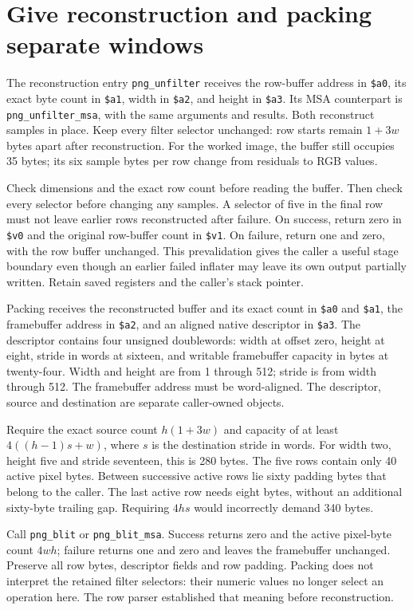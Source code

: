 \section{Give reconstruction and packing separate windows}
The reconstruction entry \texttt{png\_unfilter} receives the row-buffer address in
\texttt{\$a0}, its exact byte count in \texttt{\$a1}, width in \texttt{\$a2}, and
height in \texttt{\$a3}. Its MSA counterpart is \texttt{png\_unfilter\_msa}, with the
same arguments and results. Both reconstruct samples in place. Keep every filter
selector unchanged: row starts remain $1+3w$ bytes apart after reconstruction.
For the worked image, the buffer still occupies 35 bytes; its six sample bytes per
row change from residuals to RGB values.

Check dimensions and the exact row count before reading the buffer. Then check every
selector before changing any samples. A selector of five in the final row must not
leave earlier rows reconstructed after failure. On success, return zero in
\texttt{\$v0} and the original row-buffer count in \texttt{\$v1}. On failure,
return one and zero, with the row buffer unchanged. This prevalidation gives the
caller a useful stage boundary even though an earlier failed inflater may leave its
own output partially written. Retain saved registers and the caller's stack pointer.

Packing receives the reconstructed buffer and its exact count in \texttt{\$a0}
and \texttt{\$a1}, the framebuffer address in \texttt{\$a2}, and an aligned native
descriptor in \texttt{\$a3}. The descriptor contains four unsigned doublewords:
width at offset zero, height at eight, stride in words at sixteen, and writable
framebuffer capacity in bytes at twenty-four. Width and height are from 1 through
512; stride is from width through 512. The framebuffer address must be word-aligned.
The descriptor, source and destination are separate caller-owned objects.

Require the exact source count $h(1+3w)$ and capacity of at least
$4((h-1)s+w)$, where $s$ is the destination stride in words. For width two,
height five and stride seventeen, this is 280 bytes. The five rows contain only
40 active pixel bytes. Between successive active rows lie sixty padding bytes that
belong to the caller. The last active row needs eight bytes, without an additional
sixty-byte trailing gap. Requiring $4hs$ would incorrectly demand 340 bytes.

Call \texttt{png\_blit} or \texttt{png\_blit\_msa}. Success returns zero and the
active pixel-byte count $4wh$; failure returns one and zero and leaves the framebuffer
unchanged. Preserve all row bytes, descriptor fields and row padding. Packing does
not interpret the retained filter selectors: their numeric values no longer select
an operation here. The row parser established that meaning before reconstruction.
